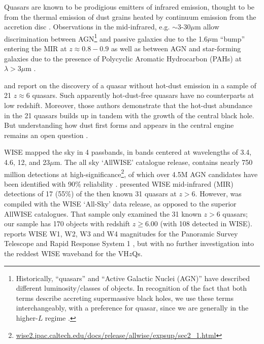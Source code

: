\documentclass[usenatbib]{mnras}
\begin{document}
Quasars are known to be prodigious emitters of infrared emission,
thought to be from the thermal emission of dust grains heated by
continuum emission from the accretion disc
\citep[e.g.,][]{Richards2006b, Leipski2014, Hill2014,
Hickox2017}. Observations in the mid-infrared, e.g. $\sim$3-30$\mu$m
allow discrimination between AGN\footnote{Historically, ``quasars''
and ``Active Galactic Nuclei (AGN)'' have described different
luminosity/classes of objects. In recognition of the fact that both
terms describe accreting supermassive black holes, we use these terms
interchangeably, with a preference for quasar, since we are generally
in the higher-$L$ regime \citep[e.g.][]{Haardt2016book}.}  and passive
galaxies due to the 1.6$\mu$m ``bump'' entering the MIR at
$z\approx0.8-0.9$ \citep[e.g., ][]{Wright1994, Sawicki2002, Lacy2004,
Stern2005, Richards2006b, Timlin2016} as well as between AGN and
star-forming galaxies due to the presence of Polycyclic Aromatic
Hydrocarbon (PAHs) at $\lambda >3\mu$m \citep[e.g., ][]{Yan2007,
Tielens2008}.

\citet{Jiang2006dust} and \citet{Jiang2010} report on the discovery of
a quasar without hot-dust emission in a sample of 21 $z\approx6$
quasars. Such apparently hot-dust-free quasars have no counterparts at
low redshift. Moreover, those authors demonstrate that the hot-dust
abundance in the 21 quasars builds up in tandem with the growth of the
central black hole. But understanding how dust first forms and appears
in the central engine remains an open question \citep{WangR2008,
WangR2011}.

WISE mapped the sky in 4 passbands, in bands centered at wavelengths
of 3.4, 4.6, 12, and 23$\mu$m. The all sky `AllWISE' catalogue
release, contains nearly 750 million detections at
high-significance\footnote{\href{wise2.ipac.caltech.edu/docs/release/allwise/expsup/sec2\_1.html}{wise2.ipac.caltech.edu/docs/release/allwise/expsup/sec2\_1.html}},
of which over 4.5M AGN candidates have been identified with 90\%
reliability \citep{Assef2018}.  \citet{Blain2013} presented WISE
mid-infrared (MIR) detections of 17 (55\%) of the then known 31
quasars at $z > 6$. However, \citet{Blain2013} was compiled with the
WISE `All-Sky' data release, as opposed to the superior AllWISE
catalogues. That sample only examined the 31 known $z>6$ quasars; our
sample has 170 objects with redshift $z \geq 6.00$ (with 108 detected
in WISE). \citet{Banados2016} reports WISE W1, W2, W3 and W4
magnitudes for the Panoramic Survey Telescope and Rapid Response
System 1 \citep[Pan-STARRS1, PS1;][]{Kaiser2002, Kaiser2010}, but with
no further investigation into the reddest WISE waveband for the
VH$z$Qs.
\end{document}
